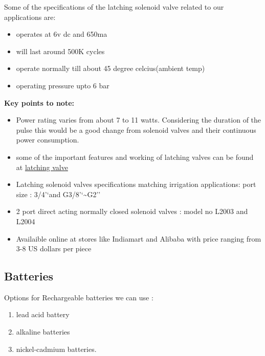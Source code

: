 \documentclass[16pt]{article}
\begin{document}
  Some of the specifications of the latching solenoid valve related to our
  applications are:
  
  \begin{itemize}

  \item
    operates at 6v dc and 650ma
  \item
    will last around 500K cycles
  \item
    operate normally till about 45 degree celcius(ambient temp)
  \item
    operating pressure upto 6 bar
  \end{itemize}
 

  \textbf{Key points to note:}

  \begin{itemize}

  \item
    Power rating varies from about 7 to 11 watts. Considering the duration
    of the pulse this would be a good change from solenoid valves and
    their continuous power consumption.
  \item
    some of the important features and working of latching valves can be
    found at \href{www.giplindia.com/latching-solenoid-valve.htm}{latching valve}  
    
  \item
    Latching solenoid valves specifications matching irrigation
    applications: port size : 3/4'`and G3/8'`\textasciitilde{}G2''
  \item
    2 port direct acting normally closed solenoid valves : model no L2003
    and L2004
  \item
    Availaible online at stores like Indiamart and Alibaba with price
    ranging from 3-8 US dollars per piece
  \end{itemize}
  


\hfill




\subsection{Batteries}

\hfill


Options for Rechargeable batteries we can use :
\hfill

\begin{enumerate}

\item
  lead acid battery
\item
  alkaline batteries
\item
  nickel-cadmium batteries.
\end{enumerate}
\end{document}
